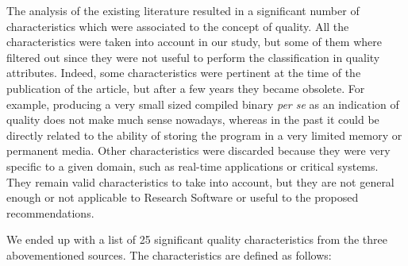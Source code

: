 
The analysis of the existing literature resulted in a significant number of characteristics which were associated to the concept of quality. All the characteristics were taken into account in our study, but some of them where filtered out since they were not useful to perform the classification in quality attributes. Indeed, some characteristics were pertinent at the time of the publication of the article, but after a few years they became obsolete. For example, producing a very small sized compiled binary \textit{per se} as an indication of quality does not make much sense nowadays, whereas in the past it could be directly related to the ability of storing the program in a very limited memory or permanent media. Other characteristics were discarded because they were very specific to a given domain, such as real-time applications or critical systems. They remain valid characteristics to take into account, but they are not general enough or not applicable to Research Software or useful to the proposed recommendations.

We ended up with a list of 25 significant quality characteristics from the three abovementioned sources. The characteristics are defined as follows:

